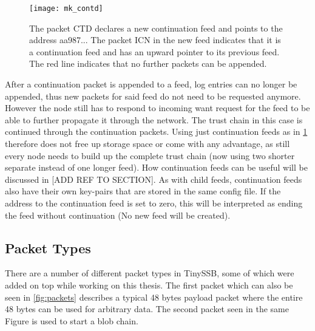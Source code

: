 \begin{figure}
\centering
\texttt{[image: mk\_contd]}
\caption{The packet CTD declares a new continuation feed and points to the address aa987... The packet ICN in the new feed indicates that it is a continuation feed and has an upward pointer to its previous feed. The red line indicates that no further packets can be appended.}
\label{fig:mk_contd}
\end{figure}

After a continuation packet is appended to a feed, log entries can no longer be appended, thus new packets for said feed do not need to be requested anymore. However the node still has to respond to incoming want request for the feed to be able to further propagate it through the network. The trust chain in this case is continued through the continuation packets. Using just continuation feeds as in \cref{fig:mk_contd} therefore does not free up storage space or come with any advantage, as still every node needs to build up the complete trust chain (now using two shorter separate instead of one longer feed). How continuation feeds can be useful will be discussed in [ADD REF TO SECTION]. As with child feeds, continuation feeds also have their own key-pairs that are stored in the same config file. If the address to the continuation feed is set to zero, this will be interpreted as ending the feed without continuation (No new feed will be created).

\subsection{Packet Types}

There are a number of different packet types in TinySSB, some of which were added on top while working on this thesis.
The first packet which can also be seen in \cref{fig:packets} describes a typical 48 bytes payload packet where the entire 48 bytes can be used for arbitrary data. The second packet seen in the same Figure is used to start a blob chain. 






